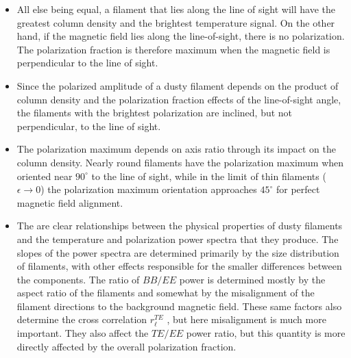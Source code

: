 \documentclass[a4paper,10pt]{article}
\begin{document}
\begin{itemize}
	\item All else being equal, a filament that lies along the line of sight will have the greatest column density and the brightest temperature signal. On the other hand, if the magnetic field lies along the line-of-sight, there is no polarization. The polarization fraction is therefore maximum when the magnetic field is perpendicular to the line of sight.
	\item Since the polarized amplitude of a dusty filament depends on the product of column density and the polarization fraction effects of the line-of-sight angle, the filaments with the brightest polarization are inclined, but not perpendicular, to the line of sight.
	\item The polarization maximum depends on axis ratio through its impact on the column density. Nearly round filaments have the polarization maximum when oriented near $90^\circ$ to the line of sight, while in the limit of thin filaments ($\epsilon\rightarrow0$) the polarization maximum orientation approaches $45^\circ$ for perfect magnetic field alignment.
	\item The are clear relationships between the physical properties of dusty filaments and the temperature and polarization power spectra that they produce. The slopes of the power spectra are determined primarily by the size distribution of filaments, with other effects responsible for the smaller differences between the components. The ratio of $BB/EE$ power is determined mostly by the aspect ratio of the filaments and somewhat by the misalignment of the filament directions to the background magnetic field. These same factors also determine the cross correlation $r_\ell^{TE}$ , but here misalignment is much more important. They also affect the $TE/EE$ power ratio, but this quantity is more directly affected by the overall polarization fraction.
\end{itemize}
\end{document}
